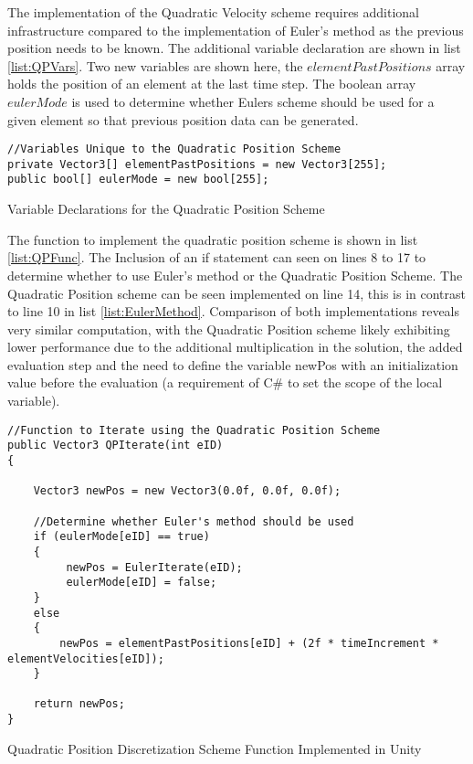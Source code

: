 The implementation of the Quadratic Velocity scheme requires additional infrastructure compared to the implementation of Euler's method as the previous position needs to be known. The additional variable declaration are shown in list \ref{list:QPVars}. Two new variables are shown here, the $elementPastPositions$ array holds the position of an element at the last time step. The boolean array $eulerMode$ is used to determine whether Eulers scheme should be used for a given element so that previous position data can be generated.

\begin{listing}[H]
\begin{verbatim}
//Variables Unique to the Quadratic Position Scheme
private Vector3[] elementPastPositions = new Vector3[255];
public bool[] eulerMode = new bool[255];
\end{verbatim}
\caption{Variable Declarations for the Quadratic Position Scheme}
\label{list:QPVars}
\end{listing}

The function to implement the quadratic position scheme is shown in list \ref{list:QPFunc}. The Inclusion of an if statement can seen on lines 8 to 17 to determine whether to use Euler's method or the Quadratic Position Scheme. The Quadratic Position scheme can be seen implemented on line 14, this is in contrast to line 10 in list \ref{list:EulerMethod}. Comparison of both implementations reveals very similar computation, with the Quadratic Position scheme likely exhibiting lower performance due to the additional multiplication in the solution, the added evaluation step and the need to define the variable newPos with an initialization value before the evaluation (a requirement of C\# to set the scope of the local variable).

\begin{listing}[H]
\begin{verbatim}
//Function to Iterate using the Quadratic Position Scheme
public Vector3 QPIterate(int eID)
{

    Vector3 newPos = new Vector3(0.0f, 0.0f, 0.0f);

    //Determine whether Euler's method should be used
    if (eulerMode[eID] == true)
    {
         newPos = EulerIterate(eID);
         eulerMode[eID] = false;
    }
    else
    {
        newPos = elementPastPositions[eID] + (2f * timeIncrement * elementVelocities[eID]);
    }

    return newPos;    
}
\end{verbatim}
\caption{Quadratic Position Discretization Scheme Function Implemented in Unity}
\label{list:QPFunc}
\end{listing}

